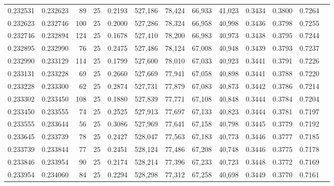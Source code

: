 \begin{tabular}{rrrrrrrrrrrrr}
0.232531 & 0.232623 &    89 &  25 &                                     0.2193 & 527,186 &  78,424 &  66,933 &  41,023 & 0.3434 & 0.3800 & 0.7264 \\
0.232623 & 0.232746 &   100 &  25 &                                     0.2000 & 527,286 &  78,324 &  66,958 &  40,998 & 0.3436 & 0.3798 & 0.7255 \\
0.232746 & 0.232894 &   124 &  25 &                                     0.1678 & 527,410 &  78,200 &  66,983 &  40,973 & 0.3438 & 0.3795 & 0.7244 \\
0.232895 & 0.232990 &    76 &  25 &                                     0.2475 & 527,486 &  78,124 &  67,008 &  40,948 & 0.3439 & 0.3793 & 0.7237 \\
0.232990 & 0.233129 &   114 &  25 &                                     0.1799 & 527,600 &  78,010 &  67,033 &  40,923 & 0.3441 & 0.3791 & 0.7226 \\
0.233131 & 0.233228 &    69 &  25 &                                     0.2660 & 527,669 &  77,941 &  67,058 &  40,898 & 0.3441 & 0.3788 & 0.7220 \\
0.233228 & 0.233300 &    62 &  25 &                                     0.2874 & 527,731 &  77,879 &  67,083 &  40,873 & 0.3442 & 0.3786 & 0.7214 \\
0.233302 & 0.233450 &   108 &  25 &                                     0.1880 & 527,839 &  77,771 &  67,108 &  40,848 & 0.3444 & 0.3784 & 0.7204 \\
0.233450 & 0.233555 &    74 &  25 &                                     0.2525 & 527,913 &  77,697 &  67,133 &  40,823 & 0.3444 & 0.3781 & 0.7197 \\
0.233555 & 0.233644 &    56 &  25 &                                     0.3086 & 527,969 &  77,641 &  67,158 &  40,798 & 0.3445 & 0.3779 & 0.7192 \\
0.233645 & 0.233739 &    78 &  25 &                                     0.2427 & 528,047 &  77,563 &  67,183 &  40,773 & 0.3446 & 0.3777 & 0.7185 \\
0.233739 & 0.233844 &    77 &  25 &                                     0.2451 & 528,124 &  77,486 &  67,208 &  40,748 & 0.3446 & 0.3775 & 0.7178 \\
0.233846 & 0.233954 &    90 &  25 &                                     0.2174 & 528,214 &  77,396 &  67,233 &  40,723 & 0.3448 & 0.3772 & 0.7169 \\
0.233954 & 0.234060 &    84 &  25 &                                     0.2294 & 528,298 &  77,312 &  67,258 &  40,698 & 0.3449 & 0.3770 & 0.7161 \\

\end{tabular}
